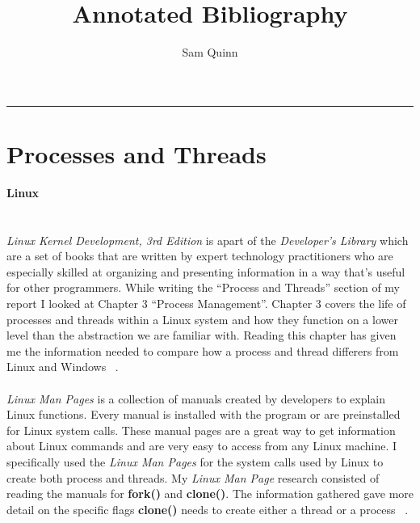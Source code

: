 \documentclass[letterpaper,10pt,notitlepage,fleqn]{article}
\title{Annotated Bibliography}
\author{Sam Quinn}
\begin{document}
\maketitle
\hrule

\section{Processes and Threads}
\textbf{Linux} \\ \\ \\
\textit{Linux Kernel Development, 3rd Edition} is apart 
of the \textit{Developer's Library} which are a set of books that are written by 
expert technology practitioners who are especially skilled at organizing and 
presenting information in a way that's useful for other programmers. While writing 
the ``Process and Threads'' section of my report I looked at Chapter 3 ``Process 
Management''. Chapter 3 covers the life of processes and threads within a Linux system 
and how they function on a lower level than the abstraction we are familiar with. 
Reading this chapter has given me the information needed to compare how a process 
and thread differers from Linux and Windows ~\cite{LKD3}.
\\ \\
\textit{Linux Man Pages} is a collection of manuals created by developers to explain Linux functions.
Every manual is installed with the program or are preinstalled for Linux system calls. 
These manual pages are a great way to get information 
about Linux commands and are very easy to access from any Linux machine. I specifically 
used the \textit{Linux Man Pages} for the system calls used by Linux to create both process and threads. 
My \textit{Linux Man Page} research consisted of reading the manuals for \textbf{fork()} and
\textbf{clone()}. The information gathered gave more detail on the specific flags 
\textbf{clone()} needs to create either a thread or a process ~\cite{LMP}.
\end{document}
